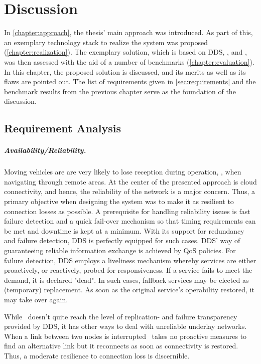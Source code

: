 \chapter{Discussion}\label{chapter:discussion}
In \autoref{chapter:approach}, the thesis' main approach was introduced. As part of this, an exemplary technology stack to realize the system was proposed (\cf \autoref{chapter:realization}). The exemplary solution, which is based on DDS, \docker , and \wnet , was then assessed with the aid of a number of benchmarks (\cf \autoref{chapter:evaluation}). In this chapter, the proposed solution is discussed, and its merits as well as its flaws are pointed out. The list of requirements given in \autoref{sec:requirements} and the benchmark results from the previous chapter serve as the foundation of the discussion. 


\section{Requirement Analysis}

\paragraph{Availability/Reliability.}
Moving vehicles are are very likely to lose reception during operation, \eg , when navigating through remote areas. At the center of the presented approach is cloud connectivity, and hence, the reliability of the network is a major concern. Thus, a primary objective when designing the system was to make it as resilient to connection losses as possible. A prerequisite for handling reliability issues is fast failure detection and a quick fail-over mechanism so that timing requirements can be met and downtime is kept at a minimum. With its support for redundancy and failure detection, DDS is perfectly equipped for such cases. DDS' way of guaranteeing reliable information exchange is achieved by QoS policies. For failure detection, DDS employs a liveliness mechanism whereby services are either proactively, or reactively, probed for responsiveness. If a service fails to meet the demand, it is declared "dead". In such cases, fallback services may be elected as (temporary) replacement. As soon as the original service's operability restored, it may take over again.

While \wnet\ doesn't quite reach the level of replication- and failure transparency provided by DDS, it has other ways to deal with unreliable underlay networks. When a link between two nodes is interrupted \weave\ takes no proactive measures to find an alternative link but it reconnects as soon as connectivity is restored. Thus, a moderate resilience to connection loss is discernible.

